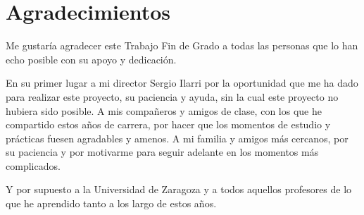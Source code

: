 \cleardoublepage


\thispagestyle{empty}


\chapter*{Agradecimientos}
\thispagestyle{empty}

       \vspace{1cm}


Me gustaría agradecer este Trabajo Fin de Grado a todas las personas que lo han echo posible con su apoyo y dedicación.

\vspace{1cm}
En su primer lugar a mi director Sergio Ilarri por la oportunidad que me ha dado para realizar este proyecto, su paciencia y ayuda, sin la cual este proyecto no hubiera sido posible. A mis compañeros y amigos de clase, con los que he compartido estos años de carrera, por hacer que los momentos de estudio y prácticas fuesen agradables y amenos. A mi familia y amigos más cercanos, por su paciencia y por motivarme para seguir adelante en los momentos más complicados.

\vspace{1cm}
Y por supuesto a la Universidad de Zaragoza y a todos aquellos profesores de lo que he aprendido tanto a los largo de estos años.

\cleardoublepage
